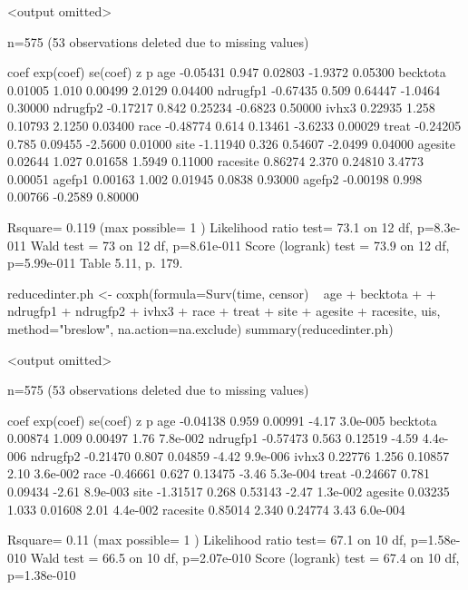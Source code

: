 <output omitted>

  n=575 (53 observations deleted due to missing values)

             coef exp(coef) se(coef)       z       p 
     age -0.05431     0.947  0.02803 -1.9372 0.05300
becktota  0.01005     1.010  0.00499  2.0129 0.04400
ndrugfp1 -0.67435     0.509  0.64447 -1.0464 0.30000
ndrugfp2 -0.17217     0.842  0.25234 -0.6823 0.50000
   ivhx3  0.22935     1.258  0.10793  2.1250 0.03400
    race -0.48774     0.614  0.13461 -3.6233 0.00029
   treat -0.24205     0.785  0.09455 -2.5600 0.01000
    site -1.11940     0.326  0.54607 -2.0499 0.04000
 agesite  0.02644     1.027  0.01658  1.5949 0.11000
racesite  0.86274     2.370  0.24810  3.4773 0.00051
  agefp1  0.00163     1.002  0.01945  0.0838 0.93000
  agefp2 -0.00198     0.998  0.00766 -0.2589 0.80000

Rsquare= 0.119   (max possible= 1 )
Likelihood ratio test= 73.1  on 12 df,   p=8.3e-011
Wald test            = 73  on 12 df,   p=8.61e-011
Score (logrank) test = 73.9  on 12 df,   p=5.99e-011
Table 5.11, p. 179.

reducedinter.ph <- coxph(formula=Surv(time, censor) ~ age + becktota + + ndrugfp1 + ndrugfp2 +
 ivhx3 + race + treat + site + agesite + racesite, uis, method="breslow", na.action=na.exclude)
summary(reducedinter.ph)

<output omitted>

  n=575 (53 observations deleted due to missing values)

             coef exp(coef) se(coef)     z        p 
     age -0.04138     0.959  0.00991 -4.17 3.0e-005
becktota  0.00874     1.009  0.00497  1.76 7.8e-002
ndrugfp1 -0.57473     0.563  0.12519 -4.59 4.4e-006
ndrugfp2 -0.21470     0.807  0.04859 -4.42 9.9e-006
   ivhx3  0.22776     1.256  0.10857  2.10 3.6e-002
    race -0.46661     0.627  0.13475 -3.46 5.3e-004
   treat -0.24667     0.781  0.09434 -2.61 8.9e-003
    site -1.31517     0.268  0.53143 -2.47 1.3e-002
 agesite  0.03235     1.033  0.01608  2.01 4.4e-002
racesite  0.85014     2.340  0.24774  3.43 6.0e-004

Rsquare= 0.11   (max possible= 1 )
Likelihood ratio test= 67.1  on 10 df,   p=1.58e-010
Wald test            = 66.5  on 10 df,   p=2.07e-010
Score (logrank) test = 67.4  on 10 df,   p=1.38e-010
